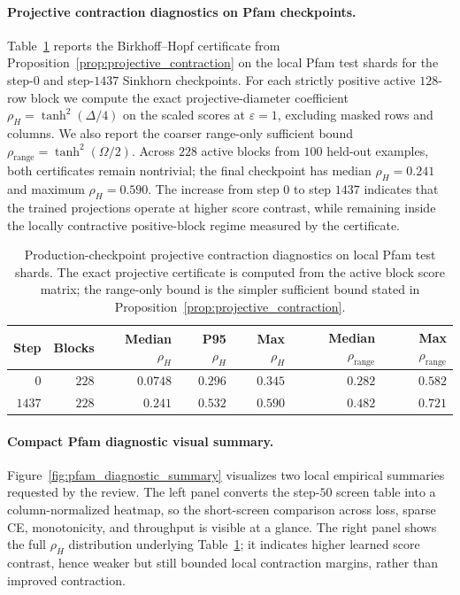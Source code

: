 \paragraph{Projective contraction diagnostics on Pfam checkpoints.}
Table~\ref{tab:pfam_projective_certificate} reports the Birkhoff--Hopf certificate from Proposition~\ref{prop:projective_contraction} on the local Pfam test shards for the step-$0$ and step-$1437$ Sinkhorn checkpoints. For each strictly positive active $128$-row block we compute the exact projective-diameter coefficient $\rho_H=\tanh^2(\Delta/4)$ on the scaled scores at $\varepsilon=1$, excluding masked rows and columns. We also report the coarser range-only sufficient bound $\rho_{\mathrm{range}}=\tanh^2(\Omega/2)$. Across $228$ active blocks from $100$ held-out examples, both certificates remain nontrivial; the final checkpoint has median $\rho_H=0.241$ and maximum $\rho_H=0.590$. The increase from step $0$ to step $1437$ indicates that the trained projections operate at higher score contrast, while remaining inside the locally contractive positive-block regime measured by the certificate.

\begin{table}[h]
    \centering
    \begin{tabular}{@{}rrrrrrr@{}}
        \toprule
        Step & Blocks & Median $\rho_H$ & P95 $\rho_H$ & Max $\rho_H$ & Median $\rho_{\mathrm{range}}$ & Max $\rho_{\mathrm{range}}$ \\
        \midrule
        $0$ & $228$ & $0.0748$ & $0.296$ & $0.345$ & $0.282$ & $0.582$ \\
        $1437$ & $228$ & $0.241$ & $0.532$ & $0.590$ & $0.482$ & $0.721$ \\
        \bottomrule
    \end{tabular}
    \caption{Production-checkpoint projective contraction diagnostics on local Pfam test shards. The exact projective certificate is computed from the active block score matrix; the range-only bound is the simpler sufficient bound stated in Proposition~\ref{prop:projective_contraction}.}
    \label{tab:pfam_projective_certificate}
\end{table}

\paragraph{Compact Pfam diagnostic visual summary.}
Figure~\ref{fig:pfam_diagnostic_summary} visualizes two local empirical summaries requested by the review. The left panel converts the step-$50$ screen table into a column-normalized heatmap, so the short-screen comparison across loss, sparse CE, monotonicity, and throughput is visible at a glance. The right panel shows the full $\rho_H$ distribution underlying Table~\ref{tab:pfam_projective_certificate}; it indicates higher learned score contrast, hence weaker but still bounded local contraction margins, rather than improved contraction.


